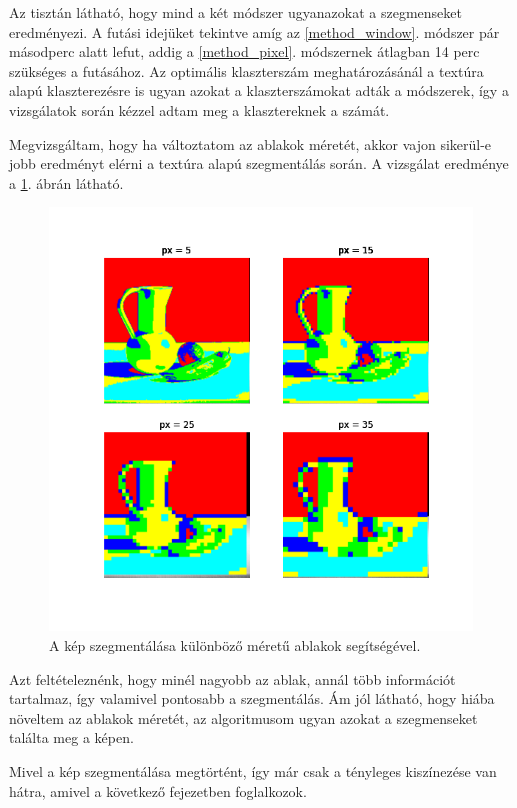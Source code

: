 Az tisztán látható, hogy mind a két módszer ugyanazokat a szegmenseket eredményezi. A futási idejüket tekintve amíg az \ref{method_window}. módszer pár másodperc alatt lefut, addig a \ref{method_pixel}. módszernek átlagban 14 perc szükséges a futásához. Az optimális klaszterszám meghatározásánál a textúra alapú klaszterezésre is ugyan azokat a klaszterszámokat adták a módszerek, így a vizsgálatok során kézzel adtam meg a klasztereknek a számát.

Megvizsgáltam, hogy ha változtatom az ablakok méretét, akkor vajon sikerül-e jobb eredményt elérni a textúra alapú szegmentálás során. A vizsgálat eredménye a \ref{fig:window_different_px}. ábrán látható.

\begin{figure}[h]
\centering
\includegraphics[scale=0.7]{images/window_different_px.png}
\caption{A kép szegmentálása különböző méretű ablakok segítségével.}
\label{fig:window_different_px}
\end{figure}

Azt feltételeznénk, hogy minél nagyobb az ablak, annál több információt tartalmaz, így valamivel pontosabb a szegmentálás. Ám jól látható, hogy hiába növeltem az ablakok méretét, az algoritmusom ugyan azokat a szegmenseket találta meg a képen.

Mivel a kép szegmentálása megtörtént, így már csak a tényleges kiszínezése van hátra, amivel a következő fejezetben foglalkozok. 